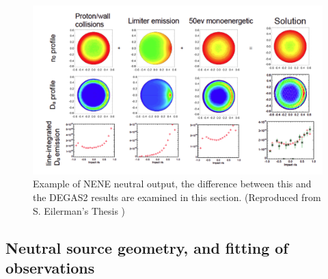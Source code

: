 \begin{figure}
	\centering
	\includegraphics[width = 1.\linewidth]{ion_transport_results/nene_example.png}
	\caption[Example of NENE neutral output]{Example of NENE neutral output, the difference between this and the DEGAS2 results are examined in this section. (Reproduced from S. Eilerman's Thesis \cite{Eilerman})}\label{fig:nene_example}
\end{figure}

\subsection{Neutral source geometry, and fitting of observations}\label{sec:neutral_source_geometry}

